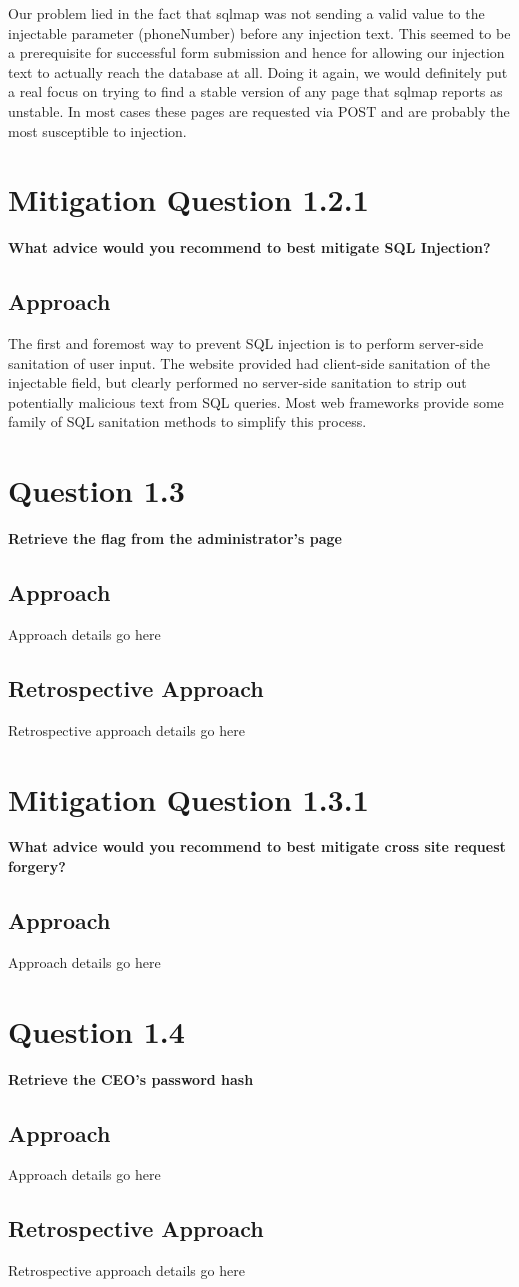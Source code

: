 Our problem lied in the fact that sqlmap was not sending a
valid value to the injectable parameter (phoneNumber) before any injection text.
This seemed to be a prerequisite for successful form submission and hence for
allowing our injection text to actually reach the database at all. Doing it
again, we would definitely put a real focus on trying to find a stable version
of any page that sqlmap reports as unstable. In most cases these pages are
requested via POST and are probably the most susceptible to injection.

\section{Mitigation Question 1.2.1}
\textbf{What advice would you recommend to best mitigate SQL Injection?}
\subsection{Approach}
The first and foremost way to prevent SQL injection is to perform server-side
sanitation of user input. The website provided had client-side sanitation of the
injectable field, but clearly performed no server-side sanitation to strip out
potentially malicious text from SQL queries. Most web frameworks provide some
family of SQL sanitation methods to simplify this process.

\section{Question 1.3}
\textbf{Retrieve the flag from the administrator's page}
\subsection{Approach}
Approach details go here
\subsection{Retrospective Approach}
Retrospective approach details go here

\section{Mitigation Question 1.3.1}
\textbf{What advice would you recommend to best mitigate cross site request
forgery?}
\subsection{Approach}
Approach details go here

\section{Question 1.4}
\textbf{Retrieve the CEO's password hash}
\subsection{Approach}
Approach details go here
\subsection{Retrospective Approach}
Retrospective approach details go here
